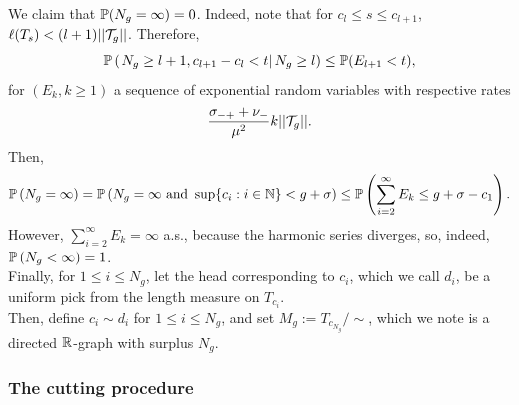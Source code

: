 We claim that $\P(N_g=\infty)=0$. Indeed, note that for $c_l\leq s\leq c_{l+1}$, $\ell(T_s)<(l+1)||\cT_g||$. Therefore, 
$$\P\left(\left.N_g\geq l+1,c_{l+1}-c_l<t \right|N_g\geq l\right)\leq \P(E_{l+1}<t),$$
for $(E_{k},k\geq 1)$ a sequence of exponential random variables with respective rates $$\frac{\sigma_{-+}+\nu_-}{\mu^2}k||\cT_g||.$$ 
Then,
$$\P\left(N_g=\infty \right)=\P\left(N_g=\infty\text{ and }\sup\{c_i:i\in \N\}<g+\sigma\right)\leq \P\left(\sum_{i=2}^\infty E_k\leq g+\sigma-c_1\right).$$
However, $\sum_{i=2}^\infty E_k=\infty$ a.s., because the harmonic series diverges, so, indeed, $\P\left(N_g<\infty \right)=1$. \\
Finally, for $1\leq i \leq N_g$, let the head corresponding to $c_i$, which we call $d_i$, be a uniform pick from the length measure on $T_{c_i}$. \\
Then, define $c_i\sim d_i$ for $1\leq i \leq N_g$, and set $M_g:=T_{c_{N_g}}/\sim$, which we note is a directed $\R$-graph with surplus $N_g$. 
\subsubsection{The cutting procedure}






